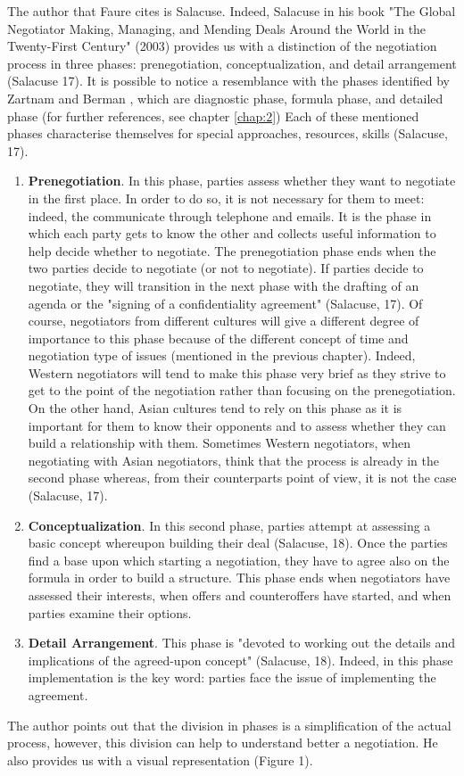 \documentclass[../main.tex]{subfiles}
\begin{document}
The author that Faure cites is Salacuse. Indeed, Salacuse in his book "The Global Negotiator Making, Managing, and Mending Deals Around the World in the Twenty-First Century" (2003)\cite{salacuse1} provides us with a distinction of the negotiation process in three phases: prenegotiation, conceptualization, and detail arrangement (Salacuse 17). It is possible to notice a resemblance with the phases identified by Zartnam and Berman \cite{zartnam2}, which are diagnostic phase, formula phase, and detailed phase (for further references, see chapter \ref{chap:2})
Each of these mentioned phases characterise themselves for special approaches, resources, skills (Salacuse, 17).
\begin{enumerate}
    \item \textbf{Prenegotiation}. In this phase, parties assess whether they want to negotiate in the first place. In order to do so, it is not necessary for them to meet: indeed, the communicate through telephone and emails. It is the phase in which each party gets to know the other and collects useful information to help decide whether to negotiate. The prenegotiation phase ends when the two parties decide to negotiate (or not to negotiate). If parties decide to negotiate, they will transition in the next phase with the drafting of an agenda or the "signing of a confidentiality agreement" (Salacuse, 17). Of course, negotiators from different cultures will give a different degree of importance to this phase because of the different concept of time and negotiation type of issues (mentioned in the previous chapter). Indeed, Western negotiators will tend to make this phase very brief as they strive to get to the point of the negotiation rather than focusing on the prenegotiation. On the other hand, Asian cultures tend to rely on this phase as it is important for them to know their opponents and to assess whether they can build a relationship with them. Sometimes Western negotiators, when negotiating with Asian negotiators, think that the process is already in the second phase whereas, from their counterparts point of view, it is not the case (Salacuse, 17).
    \item \textbf{Conceptualization}. In this second phase, parties attempt at assessing a basic concept whereupon building their deal (Salacuse, 18). Once the parties find a base upon which starting a negotiation, they have to agree also on the formula in order to build a structure. This phase ends when negotiators have assessed their interests, when offers and counteroffers have started, and when parties examine their options.
    \item \textbf{Detail Arrangement}. This phase is "devoted to working out the details and implications of the agreed-upon concept" (Salacuse, 18). Indeed, in this phase implementation is the key word: parties face the issue of implementing the agreement.
\end{enumerate}
The author points out that the division in phases is a simplification of the actual process, however, this division can help to understand better a negotiation. He also provides us with a visual representation (Figure 1).
\end{document}

